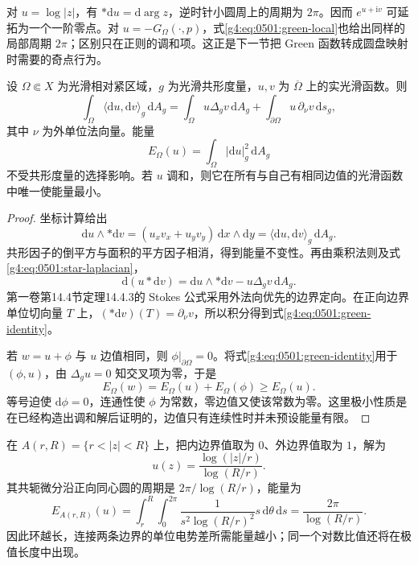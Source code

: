 对 \(u=\log|z|\)，有 \(*\mathrm{d}u=\mathrm{d}\arg z\)，逆时针小圆周上的周期为 \(2\pi\)。因而 \(e^{u+\mathrm{i}v}\) 可延拓为一个一阶零点。对 \(u=-G_\Omega(\cdot,p)\)，式\eqref{g4:eq:0501:green-local}也给出同样的局部周期 \(2\pi\)；区别只在正则的调和项。这正是下一节把 Green 函数转成圆盘映射时需要的奇点行为。

\begin{proposition}
	\label{g4:prop:0501:energy}
	设 \(\Omega\Subset X\) 为光滑相对紧区域，\(g\) 为光滑共形度量，\(u,v\) 为 \(\overline\Omega\) 上的实光滑函数。则
	\begin{equation}
		\label{g4:eq:0501:green-identity}
		\int_\Omega\langle\mathrm{d}u,\mathrm{d}v\rangle_g\,\mathrm{d}A_g
		=\int_\Omega u\Delta_gv\,\mathrm{d}A_g
		+\int_{\partial\Omega}u\,\partial_\nu v\,\mathrm{d}s_g,
	\end{equation}
	其中 \(\nu\) 为外单位法向量。能量
	\[
		E_\Omega(u)=\int_\Omega|\mathrm{d}u|_g^2\,\mathrm{d}A_g
	\]
	不受共形度量的选择影响。若 \(u\) 调和，则它在所有与自己有相同边值的光滑函数中唯一使能量最小。
\end{proposition}
\begin{proof}
	坐标计算给出
	\[
		\mathrm{d}u\wedge*\mathrm{d}v
		=(u_xv_x+u_yv_y)\,\mathrm{d}x\wedge\mathrm{d}y
		=\langle\mathrm{d}u,\mathrm{d}v\rangle_g\,\mathrm{d}A_g.
	\]
	共形因子的倒平方与面积的平方因子相消，得到能量不变性。再由乘积法则及式\eqref{g4:eq:0501:star-laplacian}，
	\[
		\mathrm{d}(u*\mathrm{d}v)
		=\mathrm{d}u\wedge*\mathrm{d}v-u\Delta_gv\,\mathrm{d}A_g.
	\]
	第一卷第14.4节定理14.4.3的 Stokes 公式采用外法向优先的边界定向。在正向边界单位切向量 \(T\) 上，\((*\mathrm{d}v)(T)=\partial_\nu v\)，所以积分得到式\eqref{g4:eq:0501:green-identity}。

	若 \(w=u+\phi\) 与 \(u\) 边值相同，则 \(\phi|_{\partial\Omega}=0\)。将式\eqref{g4:eq:0501:green-identity}用于 \((\phi,u)\)，由 \(\Delta_gu=0\) 知交叉项为零，于是
	\[
		E_\Omega(w)=E_\Omega(u)+E_\Omega(\phi)\ge E_\Omega(u).
	\]
	等号迫使 \(\mathrm{d}\phi=0\)，连通性使 \(\phi\) 为常数，零边值又使该常数为零。这里极小性质是在已经构造出调和解后证明的，边值只有连续性时并未预设能量有限。
\end{proof}

\begin{example}
	\label{g4:exm:0501:annulus-energy}
	在 \(A(r,R)=\{r<|z|<R\}\) 上，把内边界值取为 \(0\)、外边界值取为 \(1\)，解为
	\[
		u(z)=\frac{\log(|z|/r)}{\log(R/r)}.
	\]
	其共轭微分沿正向同心圆的周期是 \(2\pi/\log(R/r)\)，能量为
	\[
		E_{A(r,R)}(u)
		=\int_r^R\int_0^{2\pi}
		\frac{1}{s^2\log(R/r)^2}s\,\mathrm{d}\theta\,\mathrm{d}s
		=\frac{2\pi}{\log(R/r)}.
	\]
	因此环越长，连接两条边界的单位电势差所需能量越小；同一个对数比值还将在极值长度中出现。
\end{example}


